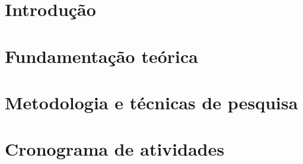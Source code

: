 \documentclass[qualificacao, mestrado]{packages/icmc}
\begin{document}
\textual

\chapter{Introdução}
\label{cap:introducao}


\chapter{Fundamentação teórica}
\label{cap:fundamentacao}


\chapter{Metodologia e técnicas de pesquisa}

\label{cap:revisao}



\chapter{Cronograma de atividades}
\label{cap:cronograma}


%


% 

\end{document}
